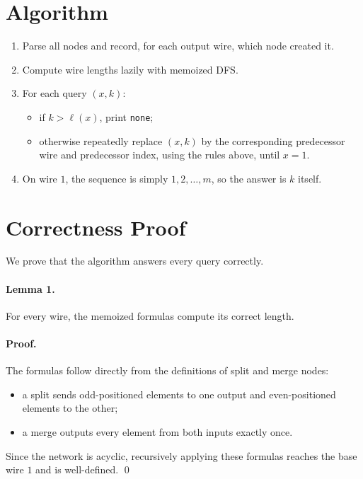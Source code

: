 \documentclass[11pt]{article}
\begin{document}
\section*{Algorithm}

\begin{enumerate}[leftmargin=*]
    \item Parse all nodes and record, for each output wire, which node created it.
    \item Compute wire lengths lazily with memoized DFS.
    \item For each query $(x,k)$:
    \begin{itemize}[leftmargin=*]
        \item if $k > \ell(x)$, print \texttt{none};
        \item otherwise repeatedly replace $(x,k)$ by the corresponding predecessor wire and predecessor
        index, using the rules above, until $x=1$.
    \end{itemize}
    \item On wire $1$, the sequence is simply $1,2,\dots,m$, so the answer is $k$ itself.
\end{enumerate}

\section*{Correctness Proof}

We prove that the algorithm answers every query correctly.

\paragraph{Lemma 1.}
For every wire, the memoized formulas compute its correct length.

\paragraph{Proof.}
The formulas follow directly from the definitions of split and merge nodes:
\begin{itemize}[leftmargin=*]
    \item a split sends odd-positioned elements to one output and even-positioned elements to the other;
    \item a merge outputs every element from both inputs exactly once.
\end{itemize}
Since the network is acyclic, recursively applying these formulas reaches the base wire $1$ and is
well-defined. \qed
\end{document}

